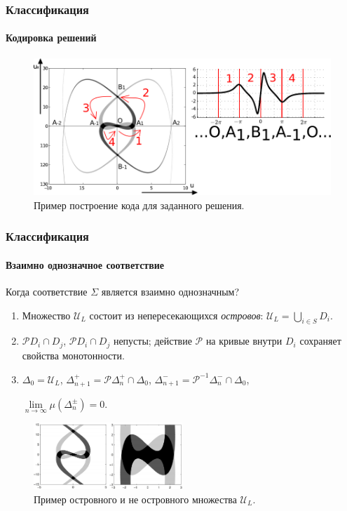 \documentclass [10pt] {beamer}
\begin{document}
\begin{frame}
	\frametitle{Классификация}
	\framesubtitle{Кодировка решений}
	
	\begin{figure}
		\includegraphics[width=1\textwidth]{pic/coding.pdf}
		\caption{Пример построение кода для заданного решения.}
		\label{pic:coding}
	\end{figure}
\end{frame}

\begin{frame}
	\frametitle{Классификация}
	\framesubtitle{Взаимно однозначное соответствие}
	
	Когда соответствие $\Sigma$ является взаимно однозначным?\footnotemark[3]
	\begin{enumerate}
		\item Множество $\mathscr{U}_L$ состоит из непересекающихся {\it островов}: $\mathscr{U}_L = \bigcup_{i \in S} D_i$.
		\item $\mathcal{P} D_i \cap D_j$, $\mathcal{P} D_i \cap D_j$ непусты; действие $\mathcal{P}$ на кривые внутри $D_i$ сохраняет свойства монотонности.
		\item $\Delta_0 = \mathscr{U}_L$, \quad $\Delta_{n + 1}^+ = \mathcal{P} \Delta_n^+ \cap \Delta_0$, \quad $\Delta_{n + 1}^- = \mathcal{P}^{-1} \Delta_n^- \cap \Delta_0$,\begin{center}
				$\lim \limits_{n \to \infty} \mu( \Delta_n^{\pm} ) = 0$.
			\end{center} 
	\end{enumerate}
	
	\begin{figure}
		\includegraphics[width=0.5\textwidth]{pic/islands.pdf}
		\caption{Пример островного и не островного множества $\mathscr{U}_{L}$.}
		\label{pic:coding}
	\end{figure}
	
\end{frame}
\end{document}
